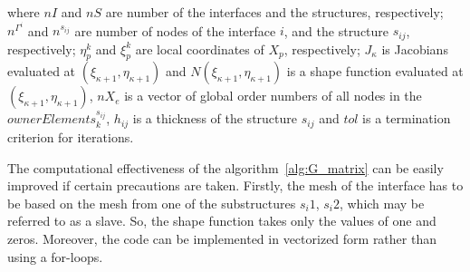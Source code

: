 \documentclass[a4paper,12pt]{article}
\begin{document}
where $nI$ and $nS$ are number of the interfaces and the structures, respectively; $n^{\Gamma^i}$ and $n^{s_{ij}}$ are number of nodes of the interface $i$, and the structure $s_{ij}$, respectively; $\eta^k_p$ and $ \xi^k_p$ are local coordinates of $X_p$, respectively; $J_{\kappa}$ is Jacobians evaluated at $(\xi_{\kappa+1},\eta_{\kappa+1})$ and $N(\xi_{\kappa+1},\eta_{\kappa+1})$ is a shape function evaluated at $(\xi_{\kappa+1},\eta_{\kappa+1})$, $nX_e$ is a vector of global order numbers of all nodes in the $ownerElements^{s_{ij}}_k$, $h_{ij}$ is a thickness of the structure $s_{ij}$ and $tol$ is a termination criterion for iterations.

The computational effectiveness of the algorithm~\ref{alg:G_matrix} can be 
easily improved if certain precautions are taken.
Firstly, the mesh of the interface has to be based on the mesh from one of the 
substructures $s_i1$, $s_i2$, which may be referred to as a slave. So, the 
shape function takes only the values of one and zeros. Moreover, the code can 
be implemented in vectorized form rather than using a for-loops.
\end{document}
